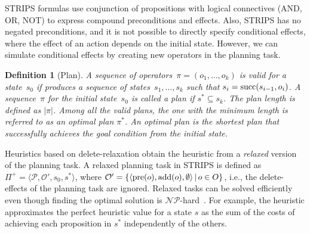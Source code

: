 \documentclass[ppgc,diss,english]{iiufrgs}
\newtheorem{definition}{Definition}
\begin{document}
STRIPS formulas use conjunction of propositions with logical connectives (AND, OR, NOT) to express compound preconditions and effects. Also, STRIPS has no negated preconditions, and it is not possible to directly specify conditional effects, where the effect of an action depends on the initial state. However, we can simulate conditional effects by creating new operators in the planning task.

\begin{definition}[Plan]\label{def:plan}
A sequence of operators~$\pi=(o_1,\ldots,o_k)$ is valid for a state~$s_0$ if produces a sequence of states~$s_1,\ldots,s_k$ such that $s_i=\operatorname{succ}(s_{i-1},o_i)$. A sequence~$\pi$ for the initial state~$s_{0}$ is called a plan if $s^{*} \subseteq s_{k}$. The plan length is defined as $|\pi|$. Among all the valid plans, the one with the minimum length is referred to as an optimal plan $\pi^{*}$. An optimal plan is the shortest plan that successfully achieves the goal condition from the initial state.
\end{definition}

Heuristics based on delete-relaxation obtain the heuristic from a \emph{relaxed} version of the planning task. A relaxed planning task in STRIPS is defined as $\Pi^{+}=\langle\mathcal{P},\mathcal{O'},s_{0},s^{*}\rangle$, where $\mathcal{O'} = \{ \langle \operatorname{pre}(o), \operatorname{add}(o), \emptyset \rangle \,|\, o \in O \}$, i.e., the delete-effects of the planning task are ignored. Relaxed tasks can be solved efficiently even though finding the optimal solution is $\mathcal{NP}$-hard~\cite{Bylander/1994}. For example, the heuristic \hadd approximates the perfect heuristic value for a state $s$ as the sum of the costs of achieving each proposition in $s^{*}$ independently of the others.
\end{document}
